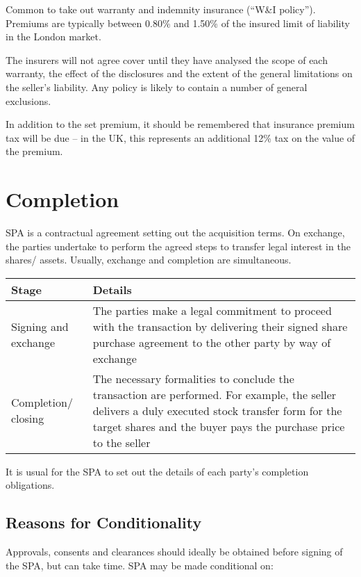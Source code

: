 \documentclass[
]{article}
\begin{document}
Common to take out warranty and indemnity insurance (``W\&I policy'').
Premiums are typically between 0.80\% and 1.50\% of the insured limit of
liability in the London market.

The insurers will not agree cover until they have analysed the scope of
each warranty, the effect of the disclosures and the extent of the
general limitations on the seller's liability. Any policy is likely to
contain a number of general exclusions.

In addition to the set premium, it should be remembered that insurance
premium tax will be due -- in the UK, this represents an additional 12\%
tax on the value of the premium.

\hypertarget{completion}{%
\section{Completion}\label{completion}}

SPA is a contractual agreement setting out the acquisition terms. On
exchange, the parties undertake to perform the agreed steps to transfer
legal interest in the shares/ assets. Usually, exchange and completion
are simultaneous.

\begin{longtable}[]{@{}ll@{}}
\toprule()
Stage & Details \\
\midrule()
\endhead
Signing and exchange & The parties make a legal commitment to proceed
with the transaction by delivering their signed share purchase agreement
to the other party by way of exchange \\
Completion/ closing & The necessary formalities to conclude the
transaction are performed. For example, the seller delivers a duly
executed stock transfer form for the target shares and the buyer pays
the purchase price to the seller \\
\bottomrule()
\end{longtable}

It is usual for the SPA to set out the details of each party's
completion obligations.

\hypertarget{reasons-for-conditionality}{%
\subsection{Reasons for
Conditionality}\label{reasons-for-conditionality}}

Approvals, consents and clearances should ideally be obtained before
signing of the SPA, but can take time. SPA may be made conditional on:
\end{document}
